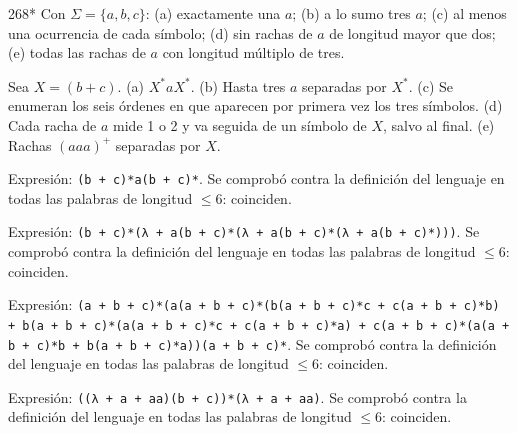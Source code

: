 \documentclass[11pt]{article}
\begin{document}
\begin{ejercicio}{268}{*}
Con $\Sigma = \{a, b, c\}$: (a) exactamente una $a$; (b) a lo sumo tres $a$; (c) al menos una ocurrencia de cada símbolo; (d) sin rachas de $a$ de longitud mayor que dos; (e) todas las rachas de $a$ con longitud múltiplo de tres.
\end{ejercicio}
\proc Sea $X = (b + c)$. (a) $X^*aX^*$. (b) Hasta tres $a$ separadas por $X^*$. (c) Se enumeran los seis órdenes en que aparecen por primera vez los tres símbolos. (d) Cada racha de $a$ mide 1 o 2 y va seguida de un símbolo de $X$, salvo al final. (e) Rachas $(aaa)^+$ separadas por $X$.\par Expresión: \texttt{(b + c)*a(b + c)*}. Se comprobó contra la definición del lenguaje en todas las palabras de longitud $\le 6$: coinciden.
\par Expresión: \texttt{(b + c)*(λ + a(b + c)*(λ + a(b + c)*(λ + a(b + c)*)))}. Se comprobó contra la definición del lenguaje en todas las palabras de longitud $\le 6$: coinciden.
\par Expresión: \texttt{(a + b + c)*(a(a + b + c)*(b(a + b + c)*c + c(a + b + c)*b) + b(a + b + c)*(a(a + b + c)*c + c(a + b + c)*a) + c(a + b + c)*(a(a + b + c)*b + b(a + b + c)*a))(a + b + c)*}. Se comprobó contra la definición del lenguaje en todas las palabras de longitud $\le 6$: coinciden.
\par Expresión: \texttt{((λ + a + aa)(b + c))*(λ + a + aa)}. Se comprobó contra la definición del lenguaje en todas las palabras de longitud $\le 6$: coinciden.
\end{document}

